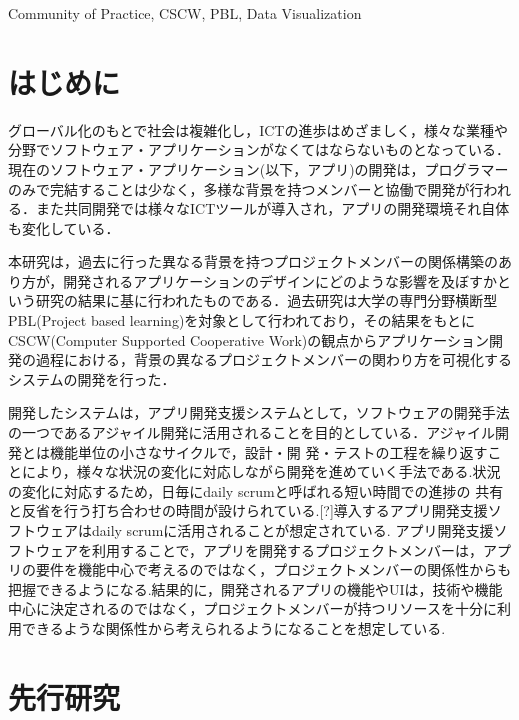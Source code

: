 \documentclass[submit,techrep]{ipsj}
\begin{document}
\begin{ekeyword}
Community of Practice, CSCW, PBL, Data Visualization
\end{ekeyword}

\maketitle

\section{はじめに}

グローバル化のもとで社会は複雑化し，ICTの進歩はめざましく，様々な業種や分野でソフトウェア・アプリケーションがなくてはならないものとなっている．現在のソフトウェア・アプリケーション(以下，アプリ)の開発は，プログラマーのみで完結することは少なく，多様な背景を持つメンバーと協働で開発が行われる．また共同開発では様々なICTツールが導入され，アプリの開発環境それ自体も変化している．


本研究は，過去に行った異なる背景を持つプロジェクトメンバーの関係構築のあり方が，開発されるアプリケーションのデザインにどのような影響を及ぼすかという研究の結果に基に行われたものである．過去研究は大学の専門分野横断型PBL(Project based learning)を対象として行われており，その結果をもとにCSCW(Computer Supported Cooperative Work)の観点からアプリケーション開発の過程における，背景の異なるプロジェクトメンバーの関わり方を可視化するシステムの開発を行った．


開発したシステムは，アプリ開発支援システムとして，ソフトウェアの開発手法の一つであるアジャイル開発に活用されることを目的としている．アジャイル開発とは機能単位の小さなサイクルで，設計・開 発・テストの工程を繰り返すことにより，様々な状況の変化に対応しながら開発を進めていく手法である.状況の変化に対応するため，日毎にdaily scrumと呼ばれる短い時間での進捗の 共有と反省を行う打ち合わせの時間が設けられている.[?]導入するアプリ開発支援ソフトウェアはdaily scrumに活用されることが想定されている.
アプリ開発支援ソフトウェアを利用することで，アプリを開発するプロジェクトメンバーは，アプリの要件を機能中心で考えるのではなく，プロジェクトメンバーの関係性からも把握できるようになる.結果的に，開発されるアプリの機能やUIは，技術や機能中心に決定されるのではなく，プロジェクトメンバーが持つリソースを十分に利用できるような関係性から考えられるようになることを想定している.

\section{先行研究}
\label{previous-research}
\end{document}
